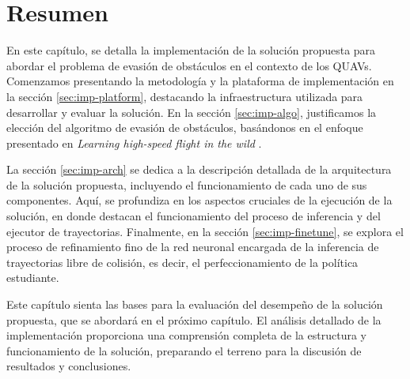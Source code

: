\section{Resumen}

En este capítulo, se detalla la implementación de la solución propuesta para abordar el problema de evasión de obstáculos en el contexto de los QUAVs. Comenzamos presentando la metodología y la plataforma de implementación en la sección \ref{sec:imp-platform}, destacando la infraestructura utilizada para desarrollar y evaluar la solución. En la sección \ref{sec:imp-algo}, justificamos la elección del algoritmo de evasión de obstáculos, basándonos en el enfoque presentado en \textit{Learning high-speed flight in the wild} \cite{Loquercio2021}.

La sección \ref{sec:imp-arch} se dedica a la descripción detallada de la arquitectura de la solución propuesta, incluyendo el funcionamiento de cada uno de sus componentes. Aquí, se profundiza en los aspectos cruciales de la ejecución de la solución, en donde destacan el funcionamiento del proceso de inferencia y del ejecutor de trayectorias. Finalmente, en la sección \ref{sec:imp-finetune}, se explora el proceso de refinamiento fino de la red neuronal encargada de la inferencia de trayectorias libre de colisión, es decir, el perfeccionamiento de la política estudiante.

Este capítulo sienta las bases para la evaluación del desempeño de la solución propuesta, que se abordará en el próximo capítulo. El análisis detallado de la implementación proporciona una comprensión completa de la estructura y funcionamiento de la solución, preparando el terreno para la discusión de resultados y conclusiones.